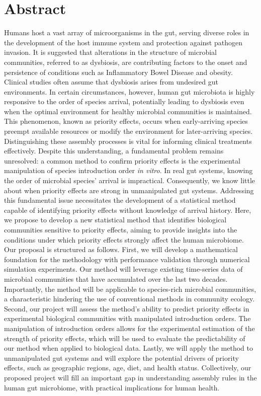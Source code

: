 \documentclass[12pt, class=article, crop=false]{standalone}
\begin{document}
\section*{Abstract}

Humans host a vast array of microorganisms in the gut, serving diverse roles in the development of the host immune system and protection against pathogen invasion.
It is suggested that alterations in the structure of microbial communities, referred to as dysbiosis, are contributing factors to the onset and persistence of conditions such as Inflammatory Bowel Disease and obesity.
Clinical studies often assume that dysbiosis arises from undesired gut environments.
In certain circumstances, however, human gut microbiota is highly responsive to the order of species arrival, potentially leading to dysbiosis even when the optimal environment for healthy microbial communities is maintained.
This phenomenon, known as priority effects, occurs when early-arriving species preempt available resources or modify the environment for later-arriving species.
Distinguishing these assembly processes is vital for informing clinical treatments effectively.
Despite this understanding, a fundamental problem remains unresolved: a common method to confirm priority effects is the experimental manipulation of species introduction order \textit{in vitro}.
In real gut systems, knowing the order of microbial species' arrival is impractical.
Consequently, we know little about when priority effects are strong in unmanipulated gut systems.
Addressing this fundamental issue necessitates the development of a statistical method capable of identifying priority effects without knowledge of arrival history.
Here, we propose to develop a new statistical method that identifies biological communities sensitive to priority effects, aiming to provide insights into the conditions under which priority effects strongly affect the human microbiome.
Our proposal is structured as follows.
First, we will develop a mathematical foundation for the methodology with performance validation through numerical simulation experiments.
Our method will leverage existing time-series data of microbial communities that have accumulated over the last two decades.
Importantly, the method will be applicable to species-rich microbial communities, a characteristic hindering the use of conventional methods in community ecology.
Second, our project will assess the method's ability to predict priority effects in experimental biological communities with manipulated introduction orders.
The manipulation of introduction orders allows for the experimental estimation of the strength of priority effects, which will be used to evaluate the predictability of our method when applied to biological data.
Lastly, we will apply the method to unmanipulated gut systems and will explore the potential drivers of priority effects, such as geographic regions, age, diet, and health status.
Collectively, our proposed project will fill an important gap in understanding assembly rules in the human gut microbiome, with practical implications for human health.
\end{document}
